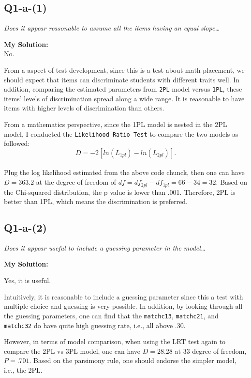 \documentclass[
]{article}
\begin{document}
\hypertarget{q1-a-1}{%
\subsection{Q1-a-(1)}\label{q1-a-1}}

\emph{Does it appear reasonable to assume all the items having an equal
slope\ldots{}}

\textbf{My Solution:}\\
No.~

From a aspect of test development, since this is a test about math
placement, we should expect that items can discriminate students with
different traits well. In addition, comparing the estimated parameters
from \texttt{2PL} model versus \texttt{1PL}, these items' levels of
discrimination spread along a wide range. It is reasonable to have items
with higher levels of discrimination than others.

From a mathematics perspective, since the 1PL model is nested in the 2PL
model, I conducted the \texttt{Likelihood\ Ratio\ Test} to compare the
two models as followed: \[D = -2[ln(L_{1pl})-ln(L_{2pl})] .\]\\
Plug the log likelihood estimated from the above code chunck, then one
can have \(D = 363.2\) at the degree of freedom of
\(df = df_{2pl}-df_{1pl} = 66-34 =32\). Based on the Chi-squared
distribution, the p value is lower than .001. Therefore, 2PL is better
than 1PL, which means the discrimination is preferred.

\hypertarget{q1-a-2}{%
\subsection{Q1-a-(2)}\label{q1-a-2}}

\emph{Does it appear useful to include a guessing parameter in the
model\ldots{}}

\textbf{My Solution:}

Yes, it is useful.

Intuitively, it is reasonable to include a guessing parameter since this
a test with multiple choice and guessing is very possible. In addition,
by looking through all the guessing parameters, one can find that the
\texttt{matchc13}, \texttt{matchc21}, and \texttt{matchc32} do have
quite high guessing rate, i.e., all above .30.

However, in terms of model comparison, when using the LRT test again to
compare the 2PL vs 3PL model, one can have \(D = 28.28\) at \(33\)
degree of freedom, \(P = .701\). Based on the parsimony rule, one should
endorse the simpler model, i.e., the 2PL.
\end{document}
